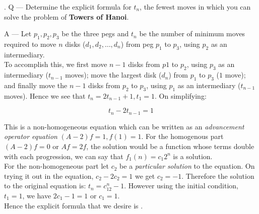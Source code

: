 \documentclass{article}
\newcounter{question}
\begin{document}
\newcommand\Que[1]{%
   \leavevmode\par
   \stepcounter{question}
   \noindent
   \thequestion. Q --- #1\par}

\newcommand\Ans[2][]{%
    \leavevmode\par\noindent
   {\leftskip37pt
    A --- \textbf{#1}#2\par}}

\Que{
    Determine the explicit formula
    for $t_n$, the fewest moves in which
    you can solve the problem of
    \textbf{Towers of Hanoi}.
}
\Ans{
    Let $p_1, p_2, p_3$ be the three pegs and
    $t_n$ be the number of minimum moves 
    required to move $n$ disks ($d_1, d_2, \dots, d_n$)
    from peg $p_1$ to $p_3$,
    using $p_2$ as an intermediary. \\

    To accomplish this, we first move $n-1$ disks
    from $p1$ to $p_2$, using $p_3$ 
    as an intermediary ($t_{n-1}$ moves);
    move the largest disk ($d_n$) from
    $p_1$ to $p_3$ ($1$ move); and finally
    move the $n-1$ disks from $p_2$ to $p_3$,
    using $p_1$ as an intermediary ($t_{n-1}$ moves).
    Hence we see that $t_n = 2t_{n-1} + 1, t_1=1$.
    On simplifying:

    \begin{equation}
        t_n-2t_{n-1}=1
    \end{equation}

    This is a non-homogeneous equation
    which can be written as an 
    \textit{advancement operator equation}
    $(A-2)f = 1, f(1)=1$.
    For the homogenous part
    $(A-2)f=0$ or $Af = 2f$, the solution would be a function
    whose terms double with each progression, we can
    say that $f_1(n)=c_1{2^n}$ is a solution. \\

    For the non-homogeneous part
    let $c_2$ be a \textit{particular solution} to
    the equation. On trying it out in the equation,
    $c_2-2c_2=1$ we get $c_2=-1$.
    Therefore the solution
    to the original equation is:
    $t_n=c_12^n-1$.
    However using the initial condition,
    $t_1=1$, we have $2c_1-1=1$ or $c_1=1$.\\

    Hence the explicit formula that we desire is
    \boxed{t_n = 2^n-1}.
    }
\end{document}
